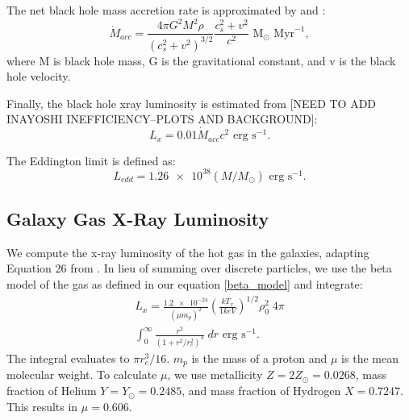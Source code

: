 \documentclass[english, apj]{emulateapj}
\begin{document}
The net black hole mass accretion rate is approximated by \citet{2018MNRAS.476.1412I} and \citet{2019arXiv190202349I}:
\begin{equation}
    \dot{M}_{acc} = \frac{4{\pi}G^2M^2\rho}{(c_s^2+v^2)^{3/2}} \frac{c_s^2+v^2}{c^2} \text{  M}_\odot \text{ Myr}^{-1},
\end{equation}
where M is black hole mass, G is the gravitational constant, and v is the black hole velocity.

Finally, the black hole xray luminosity is estimated from [NEED TO ADD INAYOSHI INEFFICIENCY--PLOTS AND BACKGROUND]:
\begin{equation}
    L_x = 0.01\dot{M}_{acc}c^2 \text{  erg s}^{-1}.
\end{equation}

The Eddington limit is defined as:
\begin{equation}
    L_{edd} = \num{1.26e38} (M/M_{\odot}) \text{  erg s}^{-1}.
\end{equation}

\subsection{Galaxy Gas X-Ray Luminosity}
We compute the x-ray luminosity of the hot gas in the galaxies, adapting Equation 26 from \citet{2012ApJ...754..125C}. In lieu of summing over discrete particles, we use the beta model of the gas as defined in our equation \ref{beta_model} and integrate:
\begin{equation}
\begin{aligned}
    L_x ={} \frac{\num{1.2e-24}}{(\mu m_p)^2}\left(\frac{kT_x}{1keV}\right)^{1/2}\rho_0^{2}\;4{\pi} \\
    \int_{0}^{\infty}\frac{r^2}{(1+r^2/r_c^2)^{3}}\;dr\text{  erg s}^{-1}.
\end{aligned}
\end{equation}
The integral evaluates to ${\pi}r_c^3/16$.  $m_p$ is the mass of a proton and $\mu$ is the mean molecular weight.  To calculate $\mu$, we use metallicity $Z=2Z_{\odot}=0.0268$, mass fraction of Helium $Y=Y_{\odot}=0.2485$, and mass fraction of Hydrogen $X=0.7247$.  This results in $\mu=0.606$.
\end{document}
